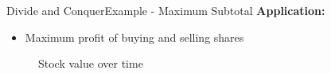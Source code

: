    


\begin{frame}{Divide and Conquer}{Example - Maximum Subtotal}
  \textbf{Application:}
  \begin{itemize}
    \item
      Maximum profit of buying and selling shares
  \end{itemize}
  \begin{figure}
    \begin{adjustbox}{width=\linewidth}
      
    \end{adjustbox}
    \caption{Stock value over time}
    \label{fig:divide_and_conquer:shares_value}
  \end{figure}
\end{frame}


